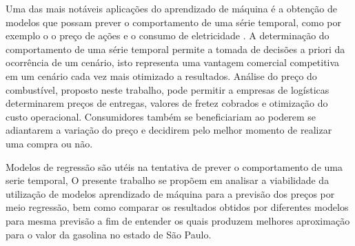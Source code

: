 Uma das mais notáveis aplicações do aprendizado de máquina é a obtenção de modelos que possam prever 
o comportamento de uma série temporal, como por exemplo o o preço de ações e o consumo de eletricidade \cite{Eletricity}.
A determinação do comportamento de uma série temporal permite a tomada de decisões a priori da ocorrência de um cenário,
isto representa uma vantagem comercial competitiva em um cenário cada vez mais otimizado a resultados.  Análise do preço do combustível, proposto neste trabalho, pode permitir a empresas de logísticas determinarem preços
de entregas, valores de fretez cobrados e otimização do custo operacional. Consumidores também se beneficiariam
ao poderem se adiantarem a variação do preço e decidirem pelo melhor momento de realizar uma compra ou não. 

Modelos de regressão são utéis na tentativa de prever o comportamento de uma serie temporal, 
O presente trabalho se propõem em analisar a viabilidade da utilização de  modelos aprendizado de máquina para a previsão dos preços por meio regressão, bem como comparar os resultados obtidos por diferentes modelos para mesma previsão a fim de entender os quais produzem melhores aproximação para o valor da gasolina no estado de São Paulo.
